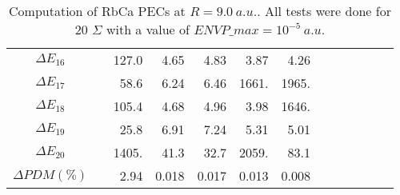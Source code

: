 \documentclass[a4paper,10pt]{article}
\begin{document}
\begin{table*}[htbp]
\begin{center}
\begin{tabular}{|c|r|r|r|r|r|r|r|r|r|r|r|r|}
$\Delta E_{16} $  	 	&	&127.0 	& 4.65 	& 4.83 	& 3.87 	& 4.26 \\
$\Delta E_{17} $  	 	&	&58.6 	& 6.24 	& 6.46 	&1661. 	& 1965. \\
$\Delta E_{18} $ 	  	&	&105.4 	& 4.68 	& 4.96 	& 3.98 	& 1646. \\
$\Delta E_{19} $ 	 	&	&25.8 	& 6.91 	& 7.24 	& 5.31 	& 5.01 \\
$\Delta E_{20} $  	 	&	&1405. 	& 41.3 	& 32.7 	&2059. 	& 83.1 \\
\hline
\hline
$\Delta PDM (\%)$		&	& 2.94 	&0.018 	&0.017 	&0.013 	& 0.008 \\
 \hline
 \end{tabular}
 \caption{\label{table9-noS} \small Computation of RbCa PECs at $R=9.0~a.u.$. All tests were done for 20 $\Sigma$ with a value of ${ENVP\_max}=10^{-5}~a.u.$} 
 \end{center}
\end{table*}
\end{document}
